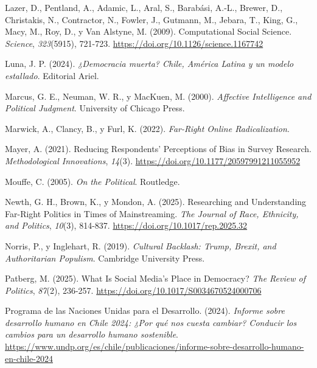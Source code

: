 \documentclass[
  letterpaper,
  numbers=noendperiod,
  fontsize=11pt,
  DIV=12,
  titlepage=false]{scrreprt}
\newlength{\cslhangindent}
\newenvironment{CSLReferences}[2] %
 {\begin{list}{}{%
  \setlength{\itemindent}{0pt}
  \setlength{\leftmargin}{0pt}
  \setlength{\parsep}{0pt}
  \ifodd #1
   \setlength{\leftmargin}{\cslhangindent}
   \setlength{\itemindent}{-1\cslhangindent}
  \fi
  \setlength{\itemsep}{#2\baselineskip}}}
 {\end{list}}
\begin{document}
\begin{CSLReferences}{1}{0}
Lazer, D., Pentland, A., Adamic, L., Aral, S., Barabási, A.-L., Brewer,
D., Christakis, N., Contractor, N., Fowler, J., Gutmann, M., Jebara, T.,
King, G., Macy, M., Roy, D., y Van Alstyne, M. (2009). Computational
Social Science. \emph{Science}, \emph{323}(5915), 721-723.
\url{https://doi.org/10.1126/science.1167742}

Luna, J. P. (2024). \emph{¿Democracia muerta? {Chile}, {América Latina}
y un modelo estallado}. Editorial Ariel.

Marcus, G. E., Neuman, W. R., y MacKuen, M. (2000). \emph{Affective
Intelligence and Political Judgment}. University of Chicago Press.

Marwick, A., Clancy, B., y Furl, K. (2022). \emph{Far-{Right Online
Radicalization}}.

Mayer, A. (2021). Reducing Respondents' Perceptions of Bias in Survey
Research. \emph{Methodological Innovations}, \emph{14}(3).
\url{https://doi.org/10.1177/20597991211055952}

Mouffe, C. (2005). \emph{On the Political}. Routledge.

Newth, G. H., Brown, K., y Mondon, A. (2025). Researching and
Understanding Far-Right Politics in Times of Mainstreaming. \emph{The
Journal of Race, Ethnicity, and Politics}, \emph{10}(3), 814-837.
\url{https://doi.org/10.1017/rep.2025.32}

Norris, P., y Inglehart, R. (2019). \emph{Cultural Backlash: {Trump},
{Brexit}, and Authoritarian Populism}. Cambridge University Press.

Patberg, M. (2025). What Is {Social Media}'s {Place} in {Democracy}?
\emph{The Review of Politics}, \emph{87}(2), 236-257.
\url{https://doi.org/10.1017/S0034670524000706}

Programa de las Naciones Unidas para el Desarrollo. (2024).
\emph{Informe sobre desarrollo humano en {Chile} 2024: ¿{Por qué} nos
cuesta cambiar? {Conducir} los cambios para un desarrollo humano
sostenible}.
\url{https://www.undp.org/es/chile/publicaciones/informe-sobre-desarrollo-humano-en-chile-2024}


\end{CSLReferences}
\end{document}
